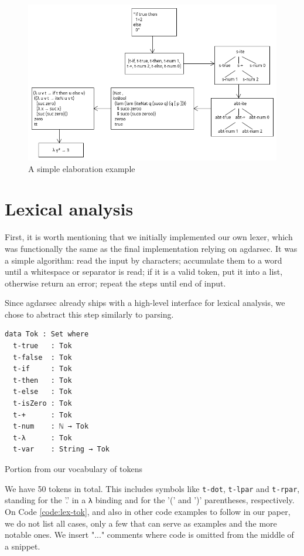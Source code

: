 \begin{figure}[h!]
	\centering
	\includegraphics[width=1.0\textwidth]{../images/example-1.png}
	\caption{A simple elaboration example}
	\label{fig:example-1}
\end{figure}

\section{Lexical analysis} \label{sec:lexer}

First, it is worth mentioning that we initially implemented our own lexer, which was functionally the same as the final implementation relying on agdarsec. It was a simple algorithm: read the input by characters; accumulate them to a word until a whitespace or separator is read; if it is a valid token, put it into a list, otherwise return an error; repeat the steps until end of input.

Since agdarsec already ships with a high-level interface for lexical analysis, we chose to abstract this step similarly to parsing.

\begin{listing}[H]
\begin{verbatim}
data Tok : Set where
  t-true   : Tok
  t-false  : Tok
  t-if     : Tok
  t-then   : Tok
  t-else   : Tok
  t-isZero : Tok
  t-+      : Tok
  t-num    : ℕ → Tok
  t-λ      : Tok
  t-var    : String → Tok
\end{verbatim}
\caption{Portion from our vocabulary of tokens}
\label{code:lex-tok}
\end{listing}

We have 50 tokens in total. This includes symbols like \verb$t-dot$, \verb$t-lpar$ and \verb$t-rpar$, standing for the '.' in a \verb$λ$ binding and for the '(' and ')' parentheses, respectively. On Code \ref{code:lex-tok}, and also in other code examples to follow in our paper, we do not list all cases, only a few that can serve as examples and the more notable ones. We insert "..." comments where code is omitted from the middle of a snippet.

